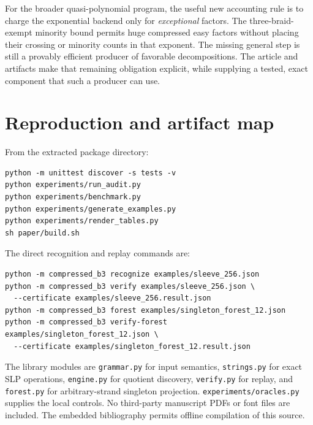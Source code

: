 \documentclass[11pt,letterpaper]{article}
\theoremstyle{definition}\newtheorem{definition}[theorem]{Definition}
\theoremstyle{remark}\newtheorem{remark}[theorem]{Remark}
\begin{document}
For the broader quasi-polynomial program, the useful new accounting rule is to charge the exponential backend only for \emph{exceptional} factors. The three-braid-exempt minority bound permits huge compressed easy factors without placing their crossing or minority counts in that exponent. The missing general step is still a provably efficient producer of favorable decompositions. The article and artifacts make that remaining obligation explicit, while supplying a tested, exact component that such a producer can use.

\appendix
\section{Reproduction and artifact map}
From the extracted package directory:
\begin{lstlisting}
python -m unittest discover -s tests -v
python experiments/run_audit.py
python experiments/benchmark.py
python experiments/generate_examples.py
python experiments/render_tables.py
sh paper/build.sh
\end{lstlisting}
The direct recognition and replay commands are:
\begin{lstlisting}
python -m compressed_b3 recognize examples/sleeve_256.json
python -m compressed_b3 verify examples/sleeve_256.json \
  --certificate examples/sleeve_256.result.json
python -m compressed_b3 forest examples/singleton_forest_12.json
python -m compressed_b3 verify-forest examples/singleton_forest_12.json \
  --certificate examples/singleton_forest_12.result.json
\end{lstlisting}
The library modules are \texttt{grammar.py} for input semantics, \texttt{strings.py} for exact SLP operations, \texttt{engine.py} for quotient discovery, \texttt{verify.py} for replay, and \texttt{forest.py} for arbitrary-strand singleton projection. \texttt{experiments/oracles.py} supplies the local controls. No third-party manuscript PDFs or font files are included. The embedded bibliography permits offline compilation of this source.
\end{document}
